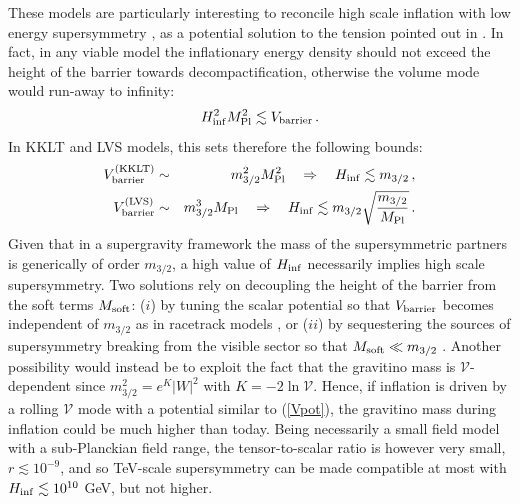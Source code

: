 These models are particularly interesting to reconcile high scale inflation with low energy supersymmetry \cite{Conlon:2008cj}, as a potential solution to the tension pointed out in \cite{Kallosh:2004yh}. In fact, in any viable model the inflationary energy density should not exceed the height of the barrier towards decompactification, otherwise the volume mode would run-away to infinity:
\begin{equation}
H_{\rm inf}^2 M_{\rm Pl}^2 \lesssim V_{\rm barrier}\,.
\end{equation}
In KKLT and LVS models, this sets therefore the following bounds:
\begin{eqnarray}
V_{\rm barrier}^{({\rm KKLT})} &\sim& m_{3/2}^2 M_{\rm Pl}^2\quad\Rightarrow\quad H_{\rm inf}\lesssim m_{3/2}\,, \\
V_{\rm barrier}^{({\rm LVS})} &\sim& m_{3/2}^3 M_{\rm Pl}\quad\Rightarrow\quad H_{\rm inf} \lesssim m_{3/2} \sqrt{\frac{m_{3/2}}{M_{\rm Pl}}}\,.
\end{eqnarray}
Given that in a supergravity framework the mass of the supersymmetric partners is generically of order $m_{3/2}$, a high value of $H_{\rm inf}$ necessarily implies high scale supersymmetry. Two solutions rely on decoupling the height of the barrier from the soft terms $M_{\rm soft}$: ($i$) by tuning the scalar potential so that $V_{\rm barrier}$ becomes independent of $m_{3/2}$ as in racetrack models \cite{Kallosh:2004yh}, or ($ii$) by sequestering the sources of supersymmetry breaking from the visible sector so that $M_{\rm soft}\ll m_{3/2}$ \cite{Blumenhagen:2009gk,Aparicio:2014wxa}. Another possibility would instead be to exploit the fact that the gravitino mass is $\mathcal{V}$-dependent since $m_{3/2}^2 = e^K |W|^2$ with $K=-2\ln\mathcal{V}$. Hence, if inflation is driven by a rolling $\mathcal{V}$ mode with a potential similar to (\ref{Vpot}), the gravitino mass during inflation could be much higher than today. Being necessarily a small field model with a sub-Planckian field range, the tensor-to-scalar ratio is however very small, $r\lesssim 10^{-9}$, and so TeV-scale supersymmetry can be made compatible at most with $H_{\rm inf}\lesssim 10^{10}$ GeV, but not higher. 

